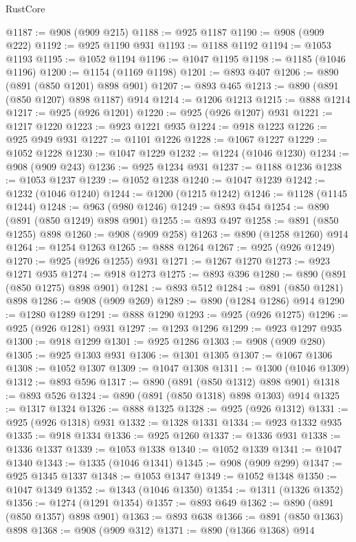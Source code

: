 \begin{lexlean}{RustCore}
\begin{coremodule}
@1187 := @908 (@909 @215)
@1188 := @925 @1187
@1190 := @908 (@909 @222)
@1192 := @925 @1190 @931
@1193 := @1188 @1192
@1194 := @1053 @1193
@1195 := @1052 @1194
@1196 := @1047 @1195
@1198 := @1185 (@1046 @1196)
@1200 := @1154 (@1169 @1198)
@1201 := @893 @407
@1206 := @890 (@891 (@850 @1201) @898 @901)
@1207 := @893 @465
@1213 := @890 (@891 (@850 @1207) @898 @1187) @914
@1214 := @1206 @1213
@1215 := @888 @1214
@1217 := @925 (@926 @1201)
@1220 := @925 (@926 @1207) @931
@1221 := @1217 @1220
@1223 := @923 @1221 @935
@1224 := @918 @1223
@1226 := @925 @949 @931
@1227 := @1101 @1226
@1228 := @1067 @1227
@1229 := @1052 @1228
@1230 := @1047 @1229
@1232 := @1224 (@1046 @1230)
@1234 := @908 (@909 @243)
@1236 := @925 @1234 @931
@1237 := @1188 @1236
@1238 := @1053 @1237
@1239 := @1052 @1238
@1240 := @1047 @1239
@1242 := @1232 (@1046 @1240)
@1244 := @1200 (@1215 @1242)
@1246 := @1128 (@1145 @1244)
@1248 := @963 (@980 @1246)
@1249 := @893 @454
@1254 := @890 (@891 (@850 @1249) @898 @901)
@1255 := @893 @497
@1258 := @891 (@850 @1255) @898
@1260 := @908 (@909 @258)
@1263 := @890 (@1258 @1260) @914
@1264 := @1254 @1263
@1265 := @888 @1264
@1267 := @925 (@926 @1249)
@1270 := @925 (@926 @1255) @931
@1271 := @1267 @1270
@1273 := @923 @1271 @935
@1274 := @918 @1273
@1275 := @893 @396
@1280 := @890 (@891 (@850 @1275) @898 @901)
@1281 := @893 @512
@1284 := @891 (@850 @1281) @898
@1286 := @908 (@909 @269)
@1289 := @890 (@1284 @1286) @914
@1290 := @1280 @1289
@1291 := @888 @1290
@1293 := @925 (@926 @1275)
@1296 := @925 (@926 @1281) @931
@1297 := @1293 @1296
@1299 := @923 @1297 @935
@1300 := @918 @1299
@1301 := @925 @1286
@1303 := @908 (@909 @280)
@1305 := @925 @1303 @931
@1306 := @1301 @1305
@1307 := @1067 @1306
@1308 := @1052 @1307
@1309 := @1047 @1308
@1311 := @1300 (@1046 @1309)
@1312 := @893 @596
@1317 := @890 (@891 (@850 @1312) @898 @901)
@1318 := @893 @526
@1324 := @890 (@891 (@850 @1318) @898 @1303) @914
@1325 := @1317 @1324
@1326 := @888 @1325
@1328 := @925 (@926 @1312)
@1331 := @925 (@926 @1318) @931
@1332 := @1328 @1331
@1334 := @923 @1332 @935
@1335 := @918 @1334
@1336 := @925 @1260
@1337 := @1336 @931
@1338 := @1336 @1337
@1339 := @1053 @1338
@1340 := @1052 @1339
@1341 := @1047 @1340
@1343 := @1335 (@1046 @1341)
@1345 := @908 (@909 @299)
@1347 := @925 @1345 @1337
@1348 := @1053 @1347
@1349 := @1052 @1348
@1350 := @1047 @1349
@1352 := @1343 (@1046 @1350)
@1354 := @1311 (@1326 @1352)
@1356 := @1274 (@1291 @1354)
@1357 := @893 @649
@1362 := @890 (@891 (@850 @1357) @898 @901)
@1363 := @893 @638
@1366 := @891 (@850 @1363) @898
@1368 := @908 (@909 @312)
@1371 := @890 (@1366 @1368) @914

\end{coremodule}
\end{lexlean}
